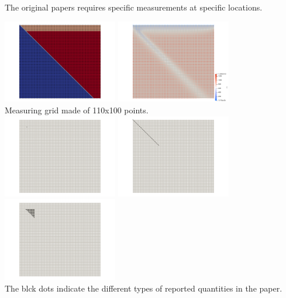 The original papers requires specific measurements at specific locations.
\begin{center}
\includegraphics[width=5cm]{python_codes/fieldstone_68/images/grid1}
\includegraphics[width=5cm]{python_codes/fieldstone_68/images/grid2}\\
{\captionfont Measuring grid made of 110x100 points.}\\
\includegraphics[width=5cm]{python_codes/fieldstone_68/images/grid3}
\includegraphics[width=5cm]{python_codes/fieldstone_68/images/grid4}
\includegraphics[width=5cm]{python_codes/fieldstone_68/images/grid5}\\
{\captionfont The blck dots indicate the different types of reported quantities in the paper.}
\end{center}


